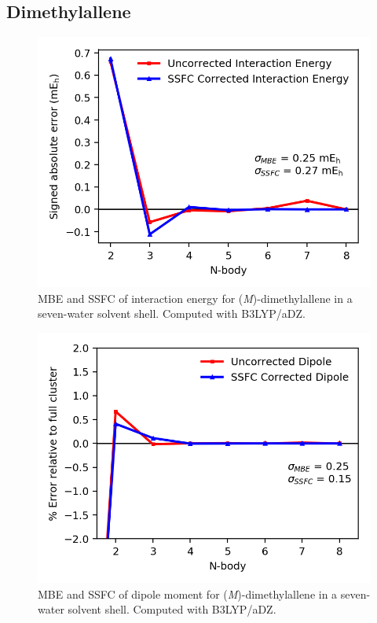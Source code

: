     \subsection{Dimethylallene}
    \begin{figure}
        \centering
        \includegraphics[scale=0.75]{p1/graphs/si/dma_7_b3_int.png}
        \caption{MBE and SSFC of interaction energy for (\textit{M})-dimethylallene in a seven-water solvent shell. Computed with B3LYP/aDZ.}
        \label{dma_7_b3_int}
    \end{figure}
    \begin{figure}
        \centering
        \includegraphics[scale=0.75]{p1/graphs/si/dma_7_b3_dip.png}
        \caption{MBE and SSFC of dipole moment for (\textit{M})-dimethylallene in a seven-water solvent shell. Computed with B3LYP/aDZ.}
        \label{dma_7_b3_dip}
    \end{figure}


